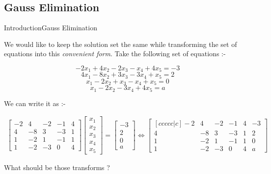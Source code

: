 \documentclass[10pt]{beamer}
\begin{document}
\subsection{Gauss Elimination}
\begin{frame}[shrink=20]{Introduction}{Gauss Elimination}

\vspace{0.25in}

We would like to keep the solution set the same while transforming the set of equations into this \textit{convenient form}. Take the following set of equations :-

$$ -2x_{1} + 4x_{2} - 2x_{3} - x_{4} + 4x_{5} = -3 $$
$$ 4x_{1} - 8x_{2} + 3x_{3} - 3x_{4} + x_{5} = 2 $$
$$ x_{1} - 2x_{2} + x_{3} - x_{4} + x_{5} = 0 $$
$$ x_{1} - 2x_{2} - 3x_{4} + 4x_{5} = a$$

We can write it as :-

\begin{align}
\begin{bmatrix} -2 & 4 & -2 & -1 & 4 \\ 4 & -8 & 3 & -3 & 1 \\ 1 & -2 & 1 & -1 & 1 \\ 1 & -2 & -3 & 0 & 4 \end{bmatrix}\begin{bmatrix} x_{1} \\ x_{2} \\ x_{3} \\ x_{4} \\ x_{5}\end{bmatrix} = \begin{bmatrix}-3 \\ 2 \\ 0 \\ a \end{bmatrix} \Leftrightarrow   \begin{bmatrix}[ccccc|c]
   -2 & 4 & -2 & -1 & 4 & -3 \\
   4 & -8 & 3 & -3 & 1 & 2\\
   1 & -2 & 1 & -1 & 1 & 0\\
   1 & -2 & -3 & 0 & 4 & a
\end{bmatrix}
\end{align}

What should be those transforms ? 

\end{frame}
\end{document}
